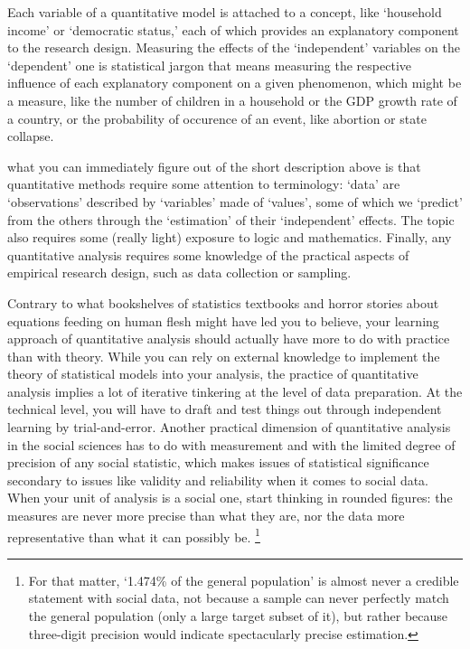 	Each variable of a quantitative model is attached to a concept, like `household income' or `democratic status,' each of which provides an explanatory component to the research design. Measuring the effects of the `independent' variables on the `dependent' one is statistical jargon that means measuring the respective influence of each explanatory component on a given phenomenon, which might be a measure, like the number of children in a household or the GDP growth rate of a country, or the probability of occurence of an event, like abortion or state collapse.%

	 what you can immediately figure out of the short description above is that quantitative methods require some attention to terminology: `data' are `observations' described by `variables' made of `values', some of which we `predict' from the others through the `estimation' of their `independent' effects. The topic also requires some (really light) exposure to logic and mathematics. Finally, any quantitative analysis requires some knowledge of the practical aspects of empirical research design, such as data collection or sampling.%

	Contrary to what bookshelves of statistics textbooks and horror stories about equations feeding on human flesh might have led you to believe, your learning approach of quantitative analysis should actually have more to do with practice than with theory. While you can rely on external knowledge to implement the theory of statistical models into your analysis, the practice of quantitative analysis implies a lot of iterative tinkering at the level of data preparation. At the technical level, you will have to draft and test things out through independent learning by trial-and-error.%
	Another practical dimension of quantitative analysis in the social sciences has to do with measurement and with the limited degree of precision of any social statistic, which makes issues of statistical significance secondary to issues like validity and reliability when it comes to social data. When your unit of analysis is a social one, start thinking in rounded figures: the measures are never more precise than what they are, nor the data more representative than what it can possibly be.%
		\footnote{For that matter, `1.474\% of the general population' is almost never a credible statement with social data, not because a sample can never perfectly match the general population (only a large target subset of it), but rather because three-digit precision would indicate spectacularly precise estimation.}%


